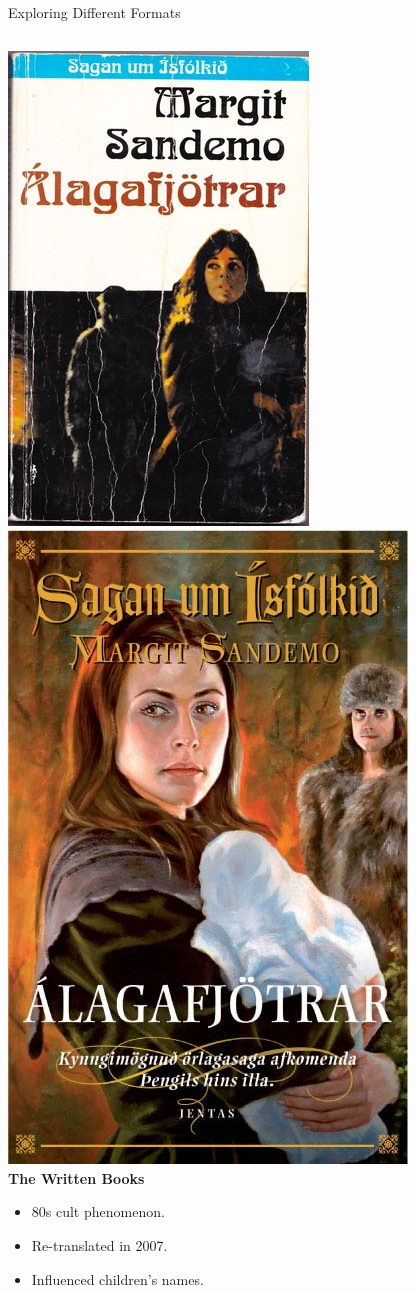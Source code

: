 \begin{frame}{Exploring Different Formats}
  \begin{columns}[T] %
    \begin{column}{0.32\textwidth}
        \includegraphics[width=.48\textwidth]{../figures/álagafjötrar_margit}
        \includegraphics[width=.48\textwidth]{../figures/álagafjötrar_jentas}\\
      \textbf{The Written Books}
      \begin{itemize}
          \item 80s cult phenomenon.
          \item Re-translated in 2007.
          \item Influenced children's names.
      \end{itemize}

\end{column}
\end{columns}
\end{frame}
